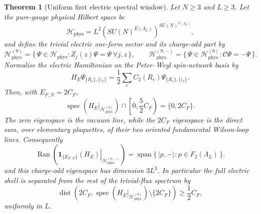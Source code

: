 \documentclass[11pt]{article}
\theoremstyle{plain}
\newtheorem{theorem}{Theorem}
\theoremstyle{definition}
\theoremstyle{remark}
\newcommand{\CF}{C_F}
\begin{document}
\begin{theorem}[Uniform first electric spectral window]\label{thm:retained-shell}
Let $N\ge3$ and $L\ge3$. Let the pure-gauge physical Hilbert space be
\[
 \mathcal H_{\mathrm{phys}}
 =L^2\!\left(SU(N)^{E(\Lambda_L)}\right)^{SU(N)^{V(\Lambda_L)}},
\]
and define the trivial electric one-form sector and its charge-odd part by
\[
 \mathcal H_{\mathrm{phys}}^{(0)}
 =\{\,\Psi\in\mathcal H_{\mathrm{phys}}:
 Z_j(z)\Psi=\Psi\ \forall j,z\,\},
 \qquad
 \mathcal H_{\mathrm{phys}}^{(0,-)}
 =\{\,\Psi\in\mathcal H_{\mathrm{phys}}^{(0)}:
  \mathcal C\Psi=-\Psi\,\}.
\]
Normalise the electric Hamiltonian on the Peter--Weyl spin-network basis by
\[
 H_E\Psi_{\{R_e\},\{\iota_v\}}
 =\frac12\sum_e C_2(R_e)\Psi_{\{R_e\},\{\iota_v\}} .
\]
Then, with $E_{F,N}=2\CF$,
\begin{equation}\label{eq:first-window}
 \operatorname{spec}\!\left(
 H_E|_{\mathcal H_{\mathrm{phys}}^{(0)}}\right)
 \cap\left[0,\frac52\CF\right)
 =\{0,2\CF\}.
\end{equation}
The zero eigenspace is the vacuum line, while the $2\CF$ eigenspace is the
direct sum, over elementary plaquettes, of their two oriented fundamental
Wilson-loop lines. Consequently
\begin{equation}\label{eq:retained-shell}
 \operatorname{Ran}\!\left(
   \left.\mathbf1_{\{E_{F,N}\}}(H_E)
   \right|_{\mathcal H_{\mathrm{phys}}^{(0,-)}}\right)
 =\operatorname{span}\{\,|p,-\rangle:p\in F_2(\Lambda_L)\,\}.
\end{equation}
and this charge-odd eigenspace has dimension $3L^3$. In particular the full
electric shell is separated from the rest of the trivial-flux spectrum by
\begin{equation}\label{eq:external-shell-gap}
 \operatorname{dist}\!\left(
 2\CF,\operatorname{spec}(H_E|_{\mathcal H_{\mathrm{phys}}^{(0)}})
 \setminus\{2\CF\}\right)\ge\frac12\CF ,
\end{equation}
uniformly in $L$.
\end{theorem}
\end{document}
